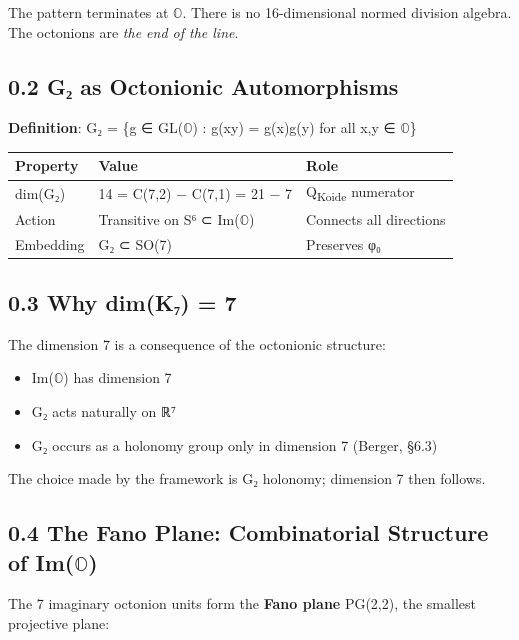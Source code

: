 \documentclass[11pt,a4paper]{article}
\begin{document}
The pattern terminates at \ensuremath{\mathbb{O}}. There is no 16-dimensional normed division algebra. The octonions are \emph{the end of the line}.

\subsection{0.2 G₂ as Octonionic Automorphisms}\label{gux2082-as-octonionic-automorphisms}

\textbf{Definition}: G₂ = \{g ∈ GL(\ensuremath{\mathbb{O}}) : g(xy) = g(x)g(y) for all x,y ∈ \ensuremath{\mathbb{O}}\}

\begin{longtable}[]{@{}lll@{}}
\toprule\noalign{}
Property & Value & Role \\
\midrule\noalign{}
\endhead
\bottomrule\noalign{}
\endlastfoot
dim(G₂) & 14 = C(7,2) − C(7,1) = 21 − 7 & Q\textsubscript{Koide} numerator \\
Action & Transitive on S⁶ ⊂ Im(\ensuremath{\mathbb{O}}) & Connects all directions \\
Embedding & G₂ ⊂ SO(7) & Preserves φ₀ \\
\end{longtable}

\subsection{0.3 Why dim(K₇) = 7}\label{why-dimkux2087-7}

The dimension 7 is a consequence of the octonionic structure:

\begin{itemize}
\tightlist
\item
  Im(\ensuremath{\mathbb{O}}) has dimension 7
\item
  G₂ acts naturally on ℝ⁷
\item
  G₂ occurs as a holonomy group only in dimension 7 (Berger, §6.3)
\end{itemize}

The choice made by the framework is G₂ holonomy; dimension 7 then follows.

\subsection{0.4 The Fano Plane: Combinatorial Structure of Im(\ensuremath{\mathbb{O}})}\label{the-fano-plane-combinatorial-structure-of-imux1d546}

The 7 imaginary octonion units form the \textbf{Fano plane} PG(2,2), the smallest projective plane:
\end{document}
